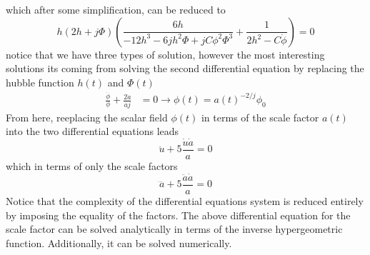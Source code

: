 \documentclass[10pt,a4paper]{article}
\begin{document}
which after some simplification, can be reduced to
\begin{equation}
  h\left(2h+j\Phi\right)\left(\frac{6h}{-12h^3-6jh^2\Phi +jC\phi^2\Phi^3} + \frac{1}{2h^2 - C\dot{\phi}}\right) = 0
\end{equation}
notice that we have three types of solution, however the most interesting solutions its coming from solving the second differential equation by replacing
the hubble function $h(t)$ and $\Phi(t)$
\begin{align}
  \frac{\dot{\phi}}{\phi} + \frac{2\dot{a}}{aj} & = 0  \to  \phi(t)  = a(t)^{-2/j}\phi_0
\end{align}
From here, reeplacing the scalar field $\phi(t)$ in terms of the scale factor $a(t)$ into the two differential equations leads 
\begin{equation}
  \ddot{u} + 5\frac{\dot{u}\dot{a}}{a} = 0
\end{equation}
which in terms of only the scale factors 
\begin{equation}
  \dddot{a}+ 5\frac{\ddot{a}\dot{a}}{a} = 0
\end{equation}
Notice that the complexity of the differential equations system is reduced entirely by imposing the equality of the factors. The above differential equation
for the scale factor can be solved analytically in terms of the inverse hypergeometric function. Additionally, it can be solved numerically.
\end{document}
